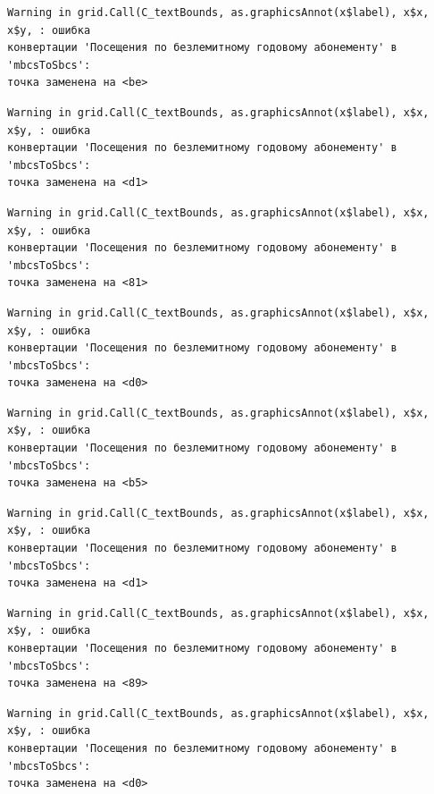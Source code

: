 \documentclass[
  letterpaper,
  DIV=11,
  numbers=noendperiod]{scrreprt}
\begin{document}
\begin{verbatim}
Warning in grid.Call(C_textBounds, as.graphicsAnnot(x$label), x$x, x$y, : ошибка
конвертации 'Посещения по безлемитному годовому абонементу' в 'mbcsToSbcs':
точка заменена на <be>
\end{verbatim}

\begin{verbatim}
Warning in grid.Call(C_textBounds, as.graphicsAnnot(x$label), x$x, x$y, : ошибка
конвертации 'Посещения по безлемитному годовому абонементу' в 'mbcsToSbcs':
точка заменена на <d1>
\end{verbatim}

\begin{verbatim}
Warning in grid.Call(C_textBounds, as.graphicsAnnot(x$label), x$x, x$y, : ошибка
конвертации 'Посещения по безлемитному годовому абонементу' в 'mbcsToSbcs':
точка заменена на <81>
\end{verbatim}

\begin{verbatim}
Warning in grid.Call(C_textBounds, as.graphicsAnnot(x$label), x$x, x$y, : ошибка
конвертации 'Посещения по безлемитному годовому абонементу' в 'mbcsToSbcs':
точка заменена на <d0>
\end{verbatim}

\begin{verbatim}
Warning in grid.Call(C_textBounds, as.graphicsAnnot(x$label), x$x, x$y, : ошибка
конвертации 'Посещения по безлемитному годовому абонементу' в 'mbcsToSbcs':
точка заменена на <b5>
\end{verbatim}

\begin{verbatim}
Warning in grid.Call(C_textBounds, as.graphicsAnnot(x$label), x$x, x$y, : ошибка
конвертации 'Посещения по безлемитному годовому абонементу' в 'mbcsToSbcs':
точка заменена на <d1>
\end{verbatim}

\begin{verbatim}
Warning in grid.Call(C_textBounds, as.graphicsAnnot(x$label), x$x, x$y, : ошибка
конвертации 'Посещения по безлемитному годовому абонементу' в 'mbcsToSbcs':
точка заменена на <89>
\end{verbatim}

\begin{verbatim}
Warning in grid.Call(C_textBounds, as.graphicsAnnot(x$label), x$x, x$y, : ошибка
конвертации 'Посещения по безлемитному годовому абонементу' в 'mbcsToSbcs':
точка заменена на <d0>
\end{verbatim}
\end{document}
